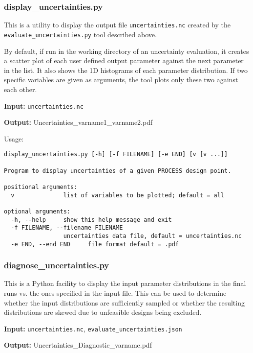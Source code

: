 \documentclass[11pt,a4paper]{article}
\begin{document}
\subsubsection{display\_uncertainties.py}

This is a utility to display the output file \texttt{uncertainties.nc} created by the \texttt{evaluate\_uncertainties.py} tool described above.

By default, if run in the working directory of an uncertainty evaluation, it creates a scatter plot of each user defined output parameter against the next parameter in the list.  It also shows the 1D histograms of each parameter distribution. If two specific variables are given as arguments, the tool plots only these two against each other.

\begin{description}
\item{\textbf{Input:}}
 \texttt{uncertainties.nc}

\item{\textbf{Output:}}
Uncertainties\_varname1\_varname2.pdf
\end{description}

Usage:
\begin{verbatim}
display_uncertainties.py [-h] [-f FILENAME] [-e END] [v [v ...]]

Program to display uncertainties of a given PROCESS design point.

positional arguments:
  v              list of variables to be plotted; default = all

optional arguments:
  -h, --help     show this help message and exit
  -f FILENAME, --filename FILENAME
                 uncertainties data file, default = uncertainties.nc
  -e END, --end END     file format default = .pdf
\end{verbatim}


\subsubsection{diagnose\_uncertainties.py}
This is a Python facility to display the input parameter distributions in the final runs vs. the ones specified in the input file. This can be used to determine whether the input distributions are sufficiently sampled or whether the resulting distributions are skewed due to unfeasible designs being excluded.

\begin{description}
\item{\textbf{Input:}}
 \texttt{uncertainties.nc}, \texttt{evaluate\_uncertainties.json}

\item{\textbf{Output:}}
Uncertainties\_Diagnostic\_varname.pdf
\end{description}
\end{document}
